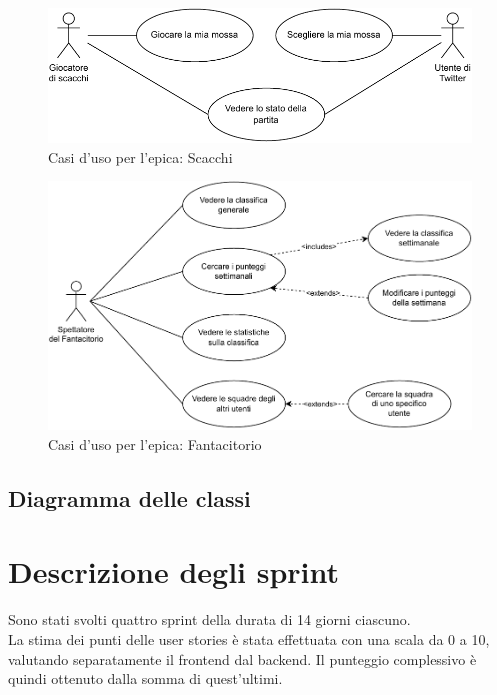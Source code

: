 \documentclass[11pt]{article}
\begin{document}
\begin{figure}[H]
    \centering
    \includegraphics[scale=0.7]{./img/usecase/chess.pdf}
    \caption{Casi d'uso per l'epica: Scacchi}
\end{figure}

\begin{figure}[H]
    \centering
    \includegraphics[scale=0.7]{./img/usecase/fantacitorio.pdf}
    \caption{Casi d'uso per l'epica: Fantacitorio}
\end{figure}


\subsection{Diagramma delle classi}




\newpage
\section{Descrizione degli sprint} \label{sprint_description}
Sono stati svolti quattro sprint della durata di 14 giorni ciascuno.\\
La stima dei punti delle user stories è stata effettuata con una scala da 0 a 10, valutando separatamente il frontend dal backend. 
Il punteggio complessivo è quindi ottenuto dalla somma di quest'ultimi.
\end{document}
